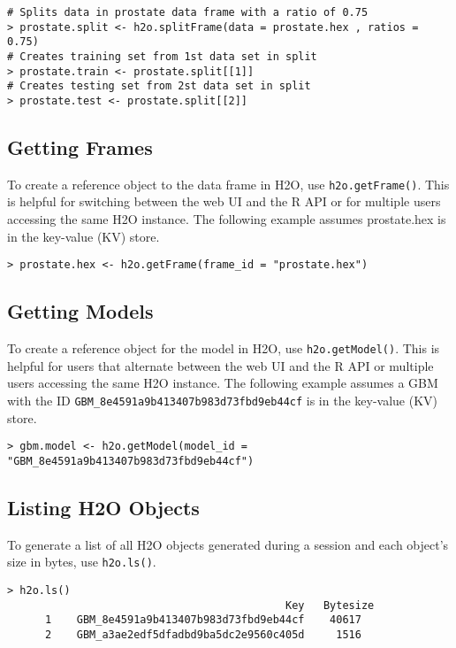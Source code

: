 {{\begin{lstlisting}[style=R]
# Splits data in prostate data frame with a ratio of 0.75
> prostate.split <- h2o.splitFrame(data = prostate.hex , ratios = 0.75)
# Creates training set from 1st data set in split
> prostate.train <- prostate.split[[1]]
# Creates testing set from 2st data set in split
> prostate.test <- prostate.split[[2]]
\end{lstlisting}

\subsection{Getting Frames}

To create a reference object to the data frame in H2O, use {\texttt{h2o.getFrame()}}. This is helpful for  switching between the web UI and the R API or for multiple users accessing the same H2O instance. The following example assumes prostate.hex is in the key-value (KV) store.

\smallskip
\begin{lstlisting}[style=R]
> prostate.hex <- h2o.getFrame(frame_id = "prostate.hex")
\end{lstlisting}


\subsection{Getting Models}
To create a reference object for the model in H2O, use {\texttt{h2o.getModel()}}. This is helpful for  users that alternate between the web UI and the R API or multiple users accessing the same H2O instance. The following example assumes a GBM with the ID \texttt{GBM\_8e4591a9b413407b983d73fbd9eb44cf} is in the key-value (KV) store.

\smallskip
\begin{lstlisting}[style=R]
> gbm.model <- h2o.getModel(model_id = "GBM_8e4591a9b413407b983d73fbd9eb44cf")
\end{lstlisting}

\newpage
\subsection{Listing H2O Objects}

To generate a list of all H2O objects generated during a session and each object’s size in bytes, use {\texttt{h2o.ls()}}.
\smallskip
\small
\begin{lstlisting}[style=R]
> h2o.ls()
                                            Key   Bytesize
      1    GBM_8e4591a9b413407b983d73fbd9eb44cf    40617
      2    GBM_a3ae2edf5dfadbd9ba5dc2e9560c405d     1516
\end{lstlisting}

}}
